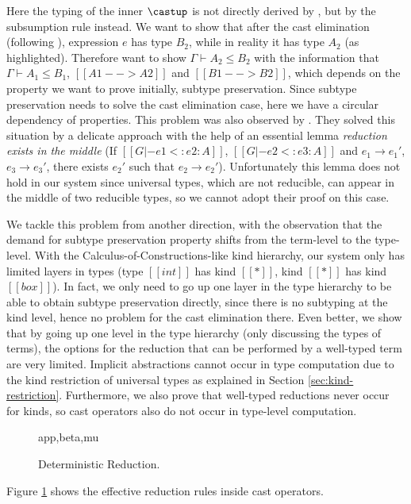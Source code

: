 Here the typing of the inner $\castup$ is not directly derived by
, but by the subsumption rule instead. We want to show that after
the cast elimination (following ), expression $e$ has type $B_2$,
while in reality it has type $A_2$ (as highlighted).
Therefore want to show $\Gamma \vdash A_2 \le B_2$ with the information that
$\Gamma \vdash A_1 \le B_1$, $[[A1 --> A2]]$
and $[[B1 --> B2]]$, which depends on the property we want to prove initially,
subtype preservation.
Since subtype preservation needs to solve the cast elimination case, here we have a
circular dependency of properties.
This problem was also observed by \cite{full}. They solved this situation
by a delicate approach with the help of an essential lemma
\emph{reduction exists in the middle} (If $[[G |- e1 <: e2 : A]]$, $[[G |- e2 <: e3 : A]]$
and $e_1 \longrightarrow e_1'$, $e_3 \longrightarrow e_3'$, there exists $e_2'$
such that $e_2 \longrightarrow e_2'$). Unfortunately this lemma does not hold
in our system since universal types, which are not reducible, can appear in the
middle of two reducible types, so we cannot adopt their proof on this case.

We tackle this problem from another direction, with the observation that the
demand for subtype preservation property shifts from the term-level to the type-level.
With the Calculus-of-Constructions-like kind hierarchy, our system only has
limited layers in types (type $[[int]]$ has kind $[[*]]$, kind $[[*]]$ has kind $[[box]]$).
In fact, we only need to go up one layer in the type hierarchy to be able to
obtain subtype preservation directly,
since there is no subtyping at the kind level,
hence no problem for the cast elimination there.
Even better, we show that by going up one level in the type hierarchy
(only discussing the types of terms), the options
for the reduction that can be performed by a well-typed term are very limited.
Implicit abstractions cannot occur in type computation due to the kind
restriction of universal types as explained in Section \ref{sec:kind-restriction}.
Furthermore, we also prove that well-typed reductions never occur
for kinds, so cast operators also do not occur in type-level computation.

\begin{figure}
      {app,beta,mu}
    \caption{Deterministic Reduction.}
    \label{fig:deterministic-reduction}
\end{figure}

Figure \ref{fig:deterministic-reduction} shows the effective reduction rules
inside cast operators.

